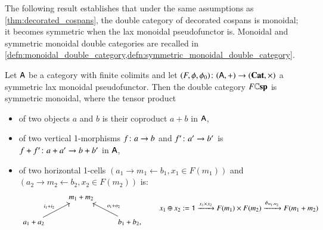 \documentclass[reqno]{amsart}
\begin{document}
The following result establishes that under the same assumptions as \cref{thm:decorated_cospans}, the double category of decorated cospans is monoidal; it becomes symmetric when the lax monoidal pseudofunctor is.  Monoidal and symmetric monoidal double categories are recalled in \cref{defn:monoidal_double_category,defn:symmetric_monoidal_double_category}.

\begin{thm}\label{DC}
Let $\mathsf{A}$ be a category with finite colimits and let $(F,\phi,\phi_0)\colon (\mathsf{A},+) \to (\mathbf{Cat},\times)$ a symmetric lax monoidal pseudofunctor. Then the double category $F\mathbf{\mathbb Csp}$ is symmetric monoidal, where the tensor product
\begin{itemize}
\item of two objects $a$ and $b$ is their coproduct $a+b$ in $\mathsf{A}$,
\item of two vertical 1-morphisms $f \colon a \to b$ and $f' \colon a' \to b'$ is $f+f' \colon a+a' \to b+b'$ in $\mathsf{A}$,
\item of two horizontal 1-cells $(a_1\to m_1\leftarrow b_1,x_1\in F(m_1))$ and $(a_2\to m_2\leftarrow b_2,x_2\in F(m_2))$ is:
\begin{equation}\label{eq:tensordecoration}
\begin{tikzcd}
& m_1+m_2 & \\
a_1+a_2\ar[ur,"i_1+i_2"] && b_1+b_2,\ar[ul,"o_1+o_2"']
\end{tikzcd}\qquad x_1\oplus x_2:=\one \xrightarrow{x_1\times x_2}F(m_1)\times F(m_2)\xrightarrow{\phi_{m_1,m_2}}F(m_1+m_2)
\end{equation}


\end{itemize}
\end{thm}
\end{document}
